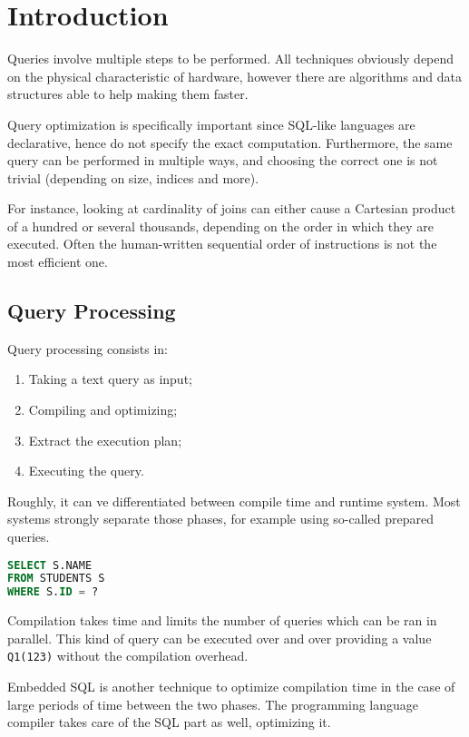 
\section{Introduction}
Queries involve multiple steps to be performed. All techniques obviously depend on the physical characteristic of hardware, however there are algorithms and data structures able to help making them faster.

Query optimization is specifically important since SQL-like languages are declarative, hence do not specify the exact computation. Furthermore, the same query can be performed in multiple ways, and choosing the correct one is not trivial (depending on size, indices and more).

For instance, looking at cardinality of joins can either cause a Cartesian product of a hundred or several thousands, depending on the order in which they are executed. Often the human-written sequential order of instructions is not the most efficient one.

\subsection{Query Processing}
Query processing consists in: 
\begin{enumerate}
	\item Taking a text query as input;
	\item Compiling and optimizing;
	\item Extract the execution plan;
	\item Executing the query.
\end{enumerate}
Roughly, it can ve differentiated between compile time and runtime system. Most systems strongly separate those phases, for example using so-called prepared queries.
\begin{lstlisting}[language=SQL]
SELECT S.NAME
FROM STUDENTS S
WHERE S.ID = ?
\end{lstlisting}
Compilation takes time and limits the number of queries which can be ran in parallel. This kind of query can be executed over and over providing a value \texttt{Q1(123)} without the compilation overhead.

Embedded SQL is another technique to optimize compilation time in the case of large periods of time between the two phases. The programming language compiler takes care of the SQL part as well, optimizing it.

